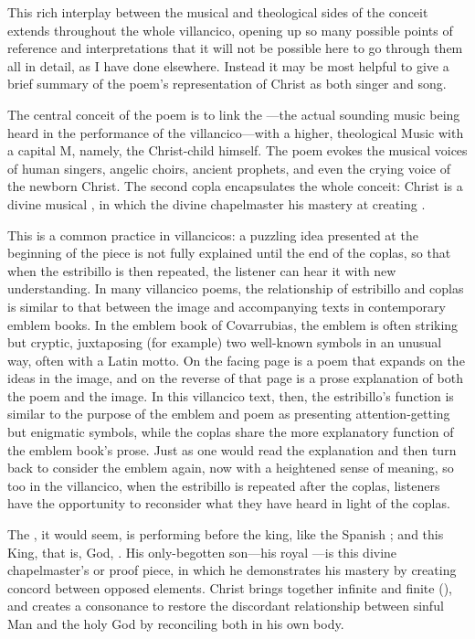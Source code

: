 This rich interplay between the musical and theological sides of the
conceit extends throughout the whole villancico, opening up so many possible
points of reference and interpretations that it will not be possible here to go
through them all in detail, as I have done elsewhere.%
    \Autocite[133--203]{Cashner:PhD}
Instead it may be most helpful to give a brief summary of the poem's
representation of Christ as both singer and song.

The central conceit of the poem is to link the ---the actual sounding music being heard in the performance of the
villancico---with a higher, theological Music with a capital M, namely, the
Christ-child himself.
The poem evokes the musical voices of human singers, angelic choirs, ancient
prophets, and even the crying voice of the newborn Christ. 
The second copla encapsulates the whole conceit: Christ is a divine musical
, in which the divine chapelmaster  
his mastery at creating .%
\begin{Footnote}
    This is a common practice in villancicos: a puzzling idea presented at the
    beginning of the piece is not fully explained until the end of the coplas,
    so that when the estribillo is then repeated, the listener can hear it with
    new understanding.
    In many villancico poems, the relationship of estribillo and coplas is
    similar to that between the image and accompanying texts in contemporary
    emblem books.%
        \Autocite{Covarrubias:Emblemas}
    In the emblem book of Covarrubias, the emblem is often striking but cryptic,
    juxtaposing (for example) two well-known symbols in an unusual way, often
    with a Latin motto.
    On the facing page is a poem that expands on the ideas in the image, and on
    the reverse of that page is a prose explanation of both the poem and the
    image.
    In this villancico text, then, the estribillo's function is similar to the
    purpose of the emblem and poem as presenting attention-getting but enigmatic
    symbols, while the coplas share the more explanatory function of the emblem
    book's prose. 
    Just as one would read the explanation and then turn back to consider the
    emblem again, now with a heightened sense of meaning, so too in the
    villancico, when the estribillo is repeated after the coplas, listeners have
    the opportunity to reconsider what they have heard in light of the coplas. 
    \end{Footnote}
The , it would seem, is performing before the king, like the
Spanish ; and this King, that is, God, .
His only-begotten son---his royal ---is this divine
chapelmaster's  or proof piece, in which he demonstrates his
mastery by creating concord between opposed elements.
Christ brings together infinite and finite (), and
creates a consonance to restore the discordant relationship between sinful Man
and the holy God by reconciling both in his own body.

